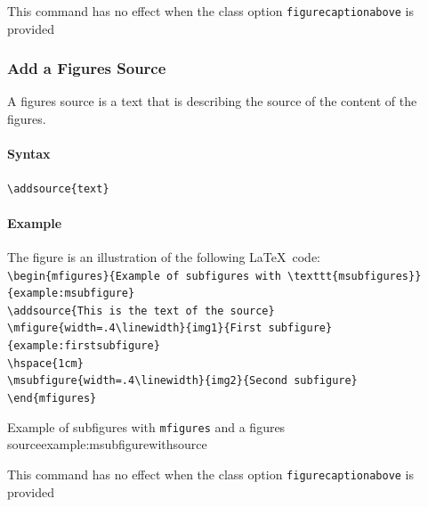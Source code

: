\documentclass[book,taskpackage,specpackage,codepackage]{upmethodology-document}
\begin{document}
\begin{upmcaution}
	This command has no effect when the class option \texttt{figurecaptionabove} is provided
\end{upmcaution}

\subsubsection{Add a Figures Source}

A figures source is a text that is describing the source of the content of the figures.

\paragraph{Syntax} \texttt{{\textbackslash}addsource\{text\}}

\paragraph{Example} The figure  is an illustration of the following \LaTeX\ code: \\
\texttt{{\textbackslash}begin\{mfigures\}\{Example of subfigures with {\textbackslash}texttt\{msubfigures\}\}\{example:msubfigure\}}\\
\texttt{{\textbackslash}addsource\{This is the text of the source\}}\\
\texttt{{\textbackslash}mfigure\{width=.4{\textbackslash}linewidth\}\{img1\}\{First subfigure\}\{example:firstsubfigure\}} \\
\texttt{{\textbackslash}hspace\{1cm\}} \\
\texttt{{\textbackslash}msubfigure\{width=.4{\textbackslash}linewidth\}\{img2\}\{Second subfigure\}} \\
\texttt{{\textbackslash}end\{mfigures\}}

\begin{mfigures}{Example of subfigures with \texttt{mfigures} and a figures source}{example:msubfigurewithsource}
	\hspace{1cm}
\end{mfigures}

\begin{upmcaution}
	This command has no effect when the class option \texttt{figurecaptionabove} is provided
\end{upmcaution}
\end{document}
